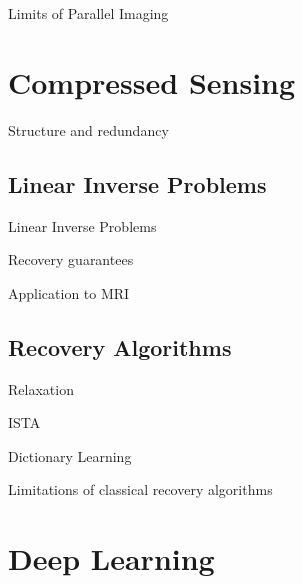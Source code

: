 \documentclass[aspectratio=169,xcolor=dvipsnames]{beamer}
\begin{document}
\begin{frame}{Limits of Parallel Imaging}
\end{frame}

\section{Compressed Sensing}
\begin{frame}{Structure and redundancy}
\end{frame}

\subsection{Linear Inverse Problems}
\begin{frame}{Linear Inverse Problems}
\end{frame}

\begin{frame}{Recovery guarantees}
\end{frame}

\begin{frame}{Application to MRI}

\end{frame}

\subsection{Recovery Algorithms}
\begin{frame}{Relaxation}

\end{frame}

\begin{frame}{ISTA}

\end{frame}

\begin{frame}{Dictionary Learning}

\end{frame}


\begin{frame}{Limitations of classical recovery algorithms}
\end{frame}

\section{Deep Learning}
\end{document}
